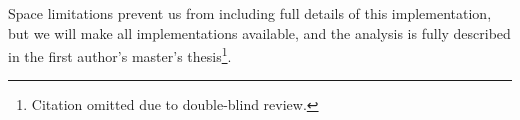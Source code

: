 Space limitations prevent us from including full details of this implementation, but we will make all implementations available, and the analysis is fully described in the first author's master's thesis\footnote{Citation omitted due to double-blind review.}.









